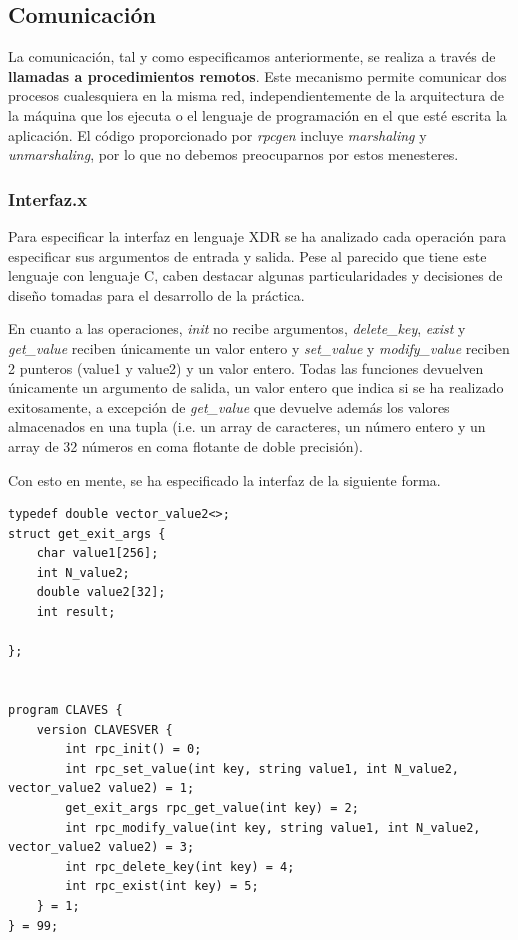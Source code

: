\documentclass[]{article}
\begin{document}
\subsection{Comunicación}
\label{subsec:comunicacion}
La comunicación, tal y como especificamos anteriormente, se realiza a través de \textbf{llamadas a procedimientos remotos}. Este mecanismo permite comunicar dos procesos cualesquiera en la misma red, independientemente de la arquitectura de la máquina que los ejecuta o el lenguaje de programación en el que esté escrita la aplicación. El código proporcionado por \textit{rpcgen} incluye \textit{marshaling} y \textit{unmarshaling}, por lo que no debemos preocuparnos por estos menesteres. 
\subsubsection{Interfaz.x}
\label{subsec:interfaz.x}
Para especificar la interfaz en lenguaje XDR se ha analizado cada operación para especificar sus argumentos de entrada y salida. Pese al parecido que tiene este lenguaje con lenguaje C, caben destacar algunas particularidades y decisiones de diseño tomadas para el desarrollo de la práctica. 

En cuanto a las operaciones, \textit{init} no recibe argumentos, \textit{delete\_key}, \textit{exist} y \textit{get\_value} reciben únicamente un valor entero y \textit{set\_value} y \textit{modify\_value} reciben 2 punteros (value1 y value2) y un valor entero. Todas las funciones devuelven únicamente un argumento de salida, un valor entero que indica si se ha realizado exitosamente, a excepción de \textit{get\_value} que devuelve además los valores almacenados en una tupla (i.e. un array de caracteres, un número entero y un array de 32 números en coma flotante de doble precisión). 

Con esto en mente, se ha especificado la interfaz de la siguiente forma. 
\begin{center}
\begin{lstlisting}[caption=Compiación de biblioteca dinámica]
typedef double vector_value2<>;
struct get_exit_args {
    char value1[256];
    int N_value2;
    double value2[32];
    int result;

};


program CLAVES {
    version CLAVESVER {
        int rpc_init() = 0;
        int rpc_set_value(int key, string value1, int N_value2, vector_value2 value2) = 1;
        get_exit_args rpc_get_value(int key) = 2;
        int rpc_modify_value(int key, string value1, int N_value2, vector_value2 value2) = 3;
        int rpc_delete_key(int key) = 4; 
        int rpc_exist(int key) = 5; 
    } = 1;
} = 99; 

\end{lstlisting}
\end{center}
\end{document}
